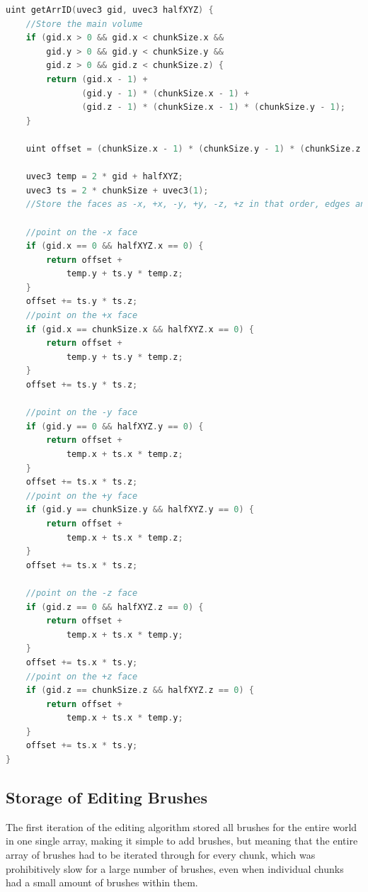 \documentclass[11pt]{article}
\begin{document}
\begin{lstlisting}[language=C++,label={tv_arrID_2},caption={The more space efficient \texttt{getArrID} function.}]
  uint getArrID(uvec3 gid, uvec3 halfXYZ) {
    //Store the main volume
    if (gid.x > 0 && gid.x < chunkSize.x &&
        gid.y > 0 && gid.y < chunkSize.y &&
        gid.z > 0 && gid.z < chunkSize.z) {
        return (gid.x - 1) +
               (gid.y - 1) * (chunkSize.x - 1) +
               (gid.z - 1) * (chunkSize.x - 1) * (chunkSize.y - 1); 
    }

    uint offset = (chunkSize.x - 1) * (chunkSize.y - 1) * (chunkSize.z - 1);

    uvec3 temp = 2 * gid + halfXYZ;
    uvec3 ts = 2 * chunkSize + uvec3(1);
    //Store the faces as -x, +x, -y, +y, -z, +z in that order, edges and corners are stored in the first place in this ordering (some unpopulated values)

    //point on the -x face
    if (gid.x == 0 && halfXYZ.x == 0) {
        return offset +
            temp.y + ts.y * temp.z;
    }
    offset += ts.y * ts.z;
    //point on the +x face
    if (gid.x == chunkSize.x && halfXYZ.x == 0) {
        return offset +
            temp.y + ts.y * temp.z;
    }
    offset += ts.y * ts.z;

    //point on the -y face
    if (gid.y == 0 && halfXYZ.y == 0) {
        return offset +
            temp.x + ts.x * temp.z;
    }
    offset += ts.x * ts.z;
    //point on the +y face
    if (gid.y == chunkSize.y && halfXYZ.y == 0) {
        return offset +
            temp.x + ts.x * temp.z;
    }
    offset += ts.x * ts.z;

    //point on the -z face
    if (gid.z == 0 && halfXYZ.z == 0) {
        return offset +
            temp.x + ts.x * temp.y;
    }
    offset += ts.x * ts.y;
    //point on the +z face
    if (gid.z == chunkSize.z && halfXYZ.z == 0) {
        return offset +
            temp.x + ts.x * temp.y;
    }
    offset += ts.x * ts.y;
}
\end{lstlisting}

\subsection{Storage of Editing Brushes}
The first iteration of the editing algorithm stored all brushes for the entire world in one single array, making it simple to add brushes, but meaning that the entire array of brushes had to be iterated through for every chunk, which was prohibitively slow for a large number of brushes, even when individual chunks had a small amount of brushes within them. 
\end{document}
